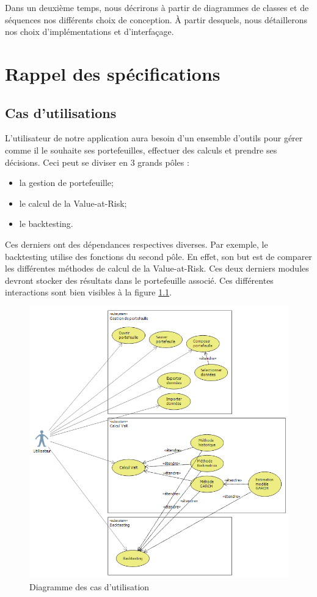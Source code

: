 \documentclass[a4paper,titlepage,french]{report}
\begin{document}
Dans un deuxième temps, nous décrirons à partir de diagrammes de classes et de séquences nos différents choix de conception.
\`A partir desquels, nous détaillerons nos choix d'implémentations et d'interfaçage.


\chapter{Rappel des spécifications}

\section{Cas d'utilisations}

L'utilisateur de notre application aura besoin d'un ensemble d'outils pour gérer comme il le souhaite ses portefeuilles, effectuer des calculs et prendre ses décisions. Ceci peut se diviser en 3 grands pôles :
\begin{itemize}
\item la gestion de portefeuille;
\item le calcul de la Value-at-Risk;
\item le backtesting.
\end{itemize}
 
Ces derniers ont des dépendances respectives diverses. Par exemple, le backtesting utilise des fonctions du second pôle.
En effet, son but est de comparer les différentes méthodes de calcul de la Value-at-Risk.
Ces deux derniers modules devront stocker des résultats dans le portefeuille associé.
Ces différentes interactions sont bien visibles à la figure \ref{fig:usecase}.

\begin{figure}[h]
 	\center
  	\includegraphics[scale=0.8]{UseCaseConception.png}
  	\caption{Diagramme des cas d'utilisation}
	\label{fig:usecase}
\end{figure}
\end{document}
